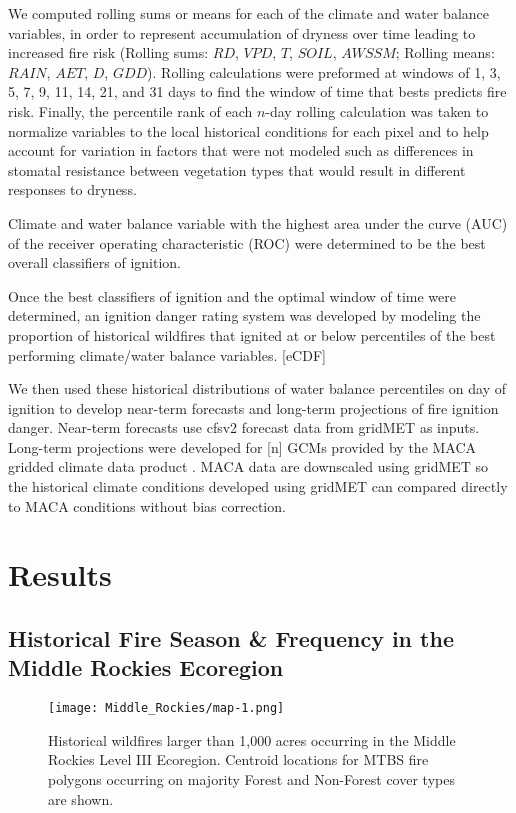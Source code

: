\documentclass{article}
\begin{document}
We computed rolling sums or means for each of the climate and water balance variables, in order to represent accumulation of dryness over time leading to increased fire risk (Rolling sums: $RD$, $VPD$, $T$, $SOIL$, $AWSSM$; Rolling means: $RAIN$, $AET$, $D$, $GDD$).  Rolling calculations were preformed at windows of 1, 3, 5, 7, 9, 11, 14, 21, and 31 days to find the window of time that bests predicts fire risk.  Finally, the percentile rank of each $n$-day rolling calculation was taken to normalize variables to the local historical conditions for each pixel and to help account for variation in factors that were not modeled such as differences in stomatal resistance between vegetation types that would result in different responses to dryness.

Climate and water balance variable with the highest area under the curve (AUC) of the receiver operating characteristic (ROC) were determined to be the best overall classifiers of ignition.  

Once the best classifiers of ignition and the optimal window of time were determined, an ignition danger rating system was developed by modeling the proportion of historical wildfires that ignited at or below percentiles of the best performing climate/water balance variables. [eCDF]

We then used these historical distributions of water balance percentiles on day of ignition to develop near-term forecasts and long-term projections of fire ignition danger.  Near-term forecasts use cfsv2 forecast data from gridMET as inputs.  Long-term projections were developed for [n] GCMs provided by the MACA gridded climate data product \citep{abatzoglouComparisonStatisticalDownscaling2012}.  MACA data are downscaled using gridMET so the historical climate conditions developed using gridMET can compared directly to MACA conditions without bias correction.

\section{Results}

\subsection{Historical Fire Season \& Frequency in the Middle Rockies Ecoregion}

\begin{figure}[ht]
  \texttt{[image: Middle\_Rockies/map-1.png]}
  \caption{Historical wildfires larger than 1,000 acres occurring in the Middle Rockies Level III Ecoregion.  Centroid locations for MTBS fire polygons occurring on majority Forest and Non-Forest cover types are shown.}
  \label{fig:map}
\end{figure}
\end{document}

